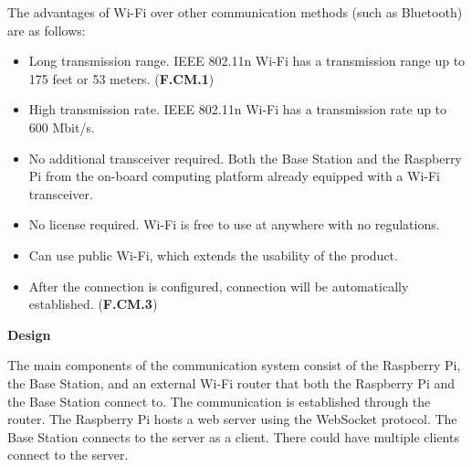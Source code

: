 The advantages of Wi-Fi over other communication methods (such as Bluetooth) are as follows:
\begin{itemize}
    \item Long transmission range. IEEE 802.11n Wi-Fi has a transmission range up to 175 feet or 53 meters. (\textbf{F.CM.1})
    \item High transmission rate. IEEE 802.11n Wi-Fi has a transmission rate up to 600 Mbit/s.
    \item No additional transceiver required. Both the Base Station and the Raspberry Pi from the on-board computing platform already equipped with a Wi-Fi transceiver.
    \item No license required. Wi-Fi is free to use at anywhere with no regulations.
    \item Can use public Wi-Fi, which extends the usability of the product.
    \item After the connection is configured, connection will be automatically established. (\textbf{F.CM.3})
\end{itemize}

\textbf{Design}

The main components of the communication system consist of the Raspberry Pi, the Base Station, and an external Wi-Fi router that both the Raspberry Pi and the Base Station connect to. The communication is established through the router. The Raspberry Pi hosts a web server using the WebSocket protocol. The Base Station connects to the server as a client. There could have multiple clients connect to the server.